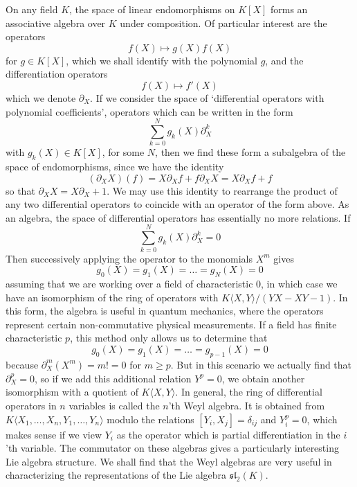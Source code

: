 \begin{example}
    On any field $K$, the space of linear endomorphisms on $K[X]$ forms an associative algebra over $K$ under composition. Of particular interest are the operators
    \[ f(X) \mapsto g(X) f(X) \]
    for $g \in K[X]$, which we shall identify with the polynomial $g$, and the differentiation operators
    \[ f(X) \mapsto f'(X) \]
    which we denote $\partial_X$. If we consider the space of `differential operators with polynomial coefficients', operators which can be written in the form
    \[ \sum_{k = 0}^N g_k(X) \partial_X^k \]
    with $g_k(X) \in K[X]$, for some $N$, then we find these form a subalgebra of the space of endomorphisms, since we have the identity
    \[ (\partial_X X)(f) = X \partial_X f + f \partial_X X = X \partial_X f + f \]
    so that $\partial_X X = X \partial_X + 1$. We may use this identity to rearrange the product of any two differential operators to coincide with an operator of the form above. As an algebra, the space of differential operators has essentially no more relations. If
    \[ \sum_{k = 0}^N g_k(X) \partial_X^k = 0 \]
    Then successively applying the operator to the monomials $X^m$ gives
    \[ g_0(X) = g_1(X) = \dots = g_N(X) = 0 \]
    assuming that we are working over a field of characteristic 0, in which case we have an isomorphism of the ring of operators with $K \langle X, Y \rangle / (YX - XY - 1)$. In this form, the algebra is useful in quantum mechanics, where the operators represent certain non-commutative physical measurements. If a field has finite characteristic $p$,  this method only allows us to determine that
    \[ g_0(X) = g_1(X) = \dots = g_{p-1}(X) = 0 \]
    because $\partial_X^m(X^m) = m! = 0$ for $m \geq p$. But in this scenario we actually find that $\partial_X^p = 0$, so if we add this additional relation $Y^p = 0$, we obtain another isomorphism with a quotient of $K \langle X, Y \rangle$. In general, the ring of differential operators in $n$ variables is called the $n$'th Weyl algebra. It is obtained from $K\langle X_1, \dots, X_n, Y_1, \dots, Y_n \rangle$ modulo the relations $[Y_i, X_j] = \delta_{ij}$ and $Y_i^p = 0$, which makes sense if we view $Y_i$ as the operator which is partial differentiation in the $i$'th variable. The commutator on these algebras gives a particularly interesting Lie algebra structure. We shall find that the Weyl algebras are very useful in characterizing the representations of the Lie algebra $\mathfrak{sl}_2(K)$.
\end{example}

